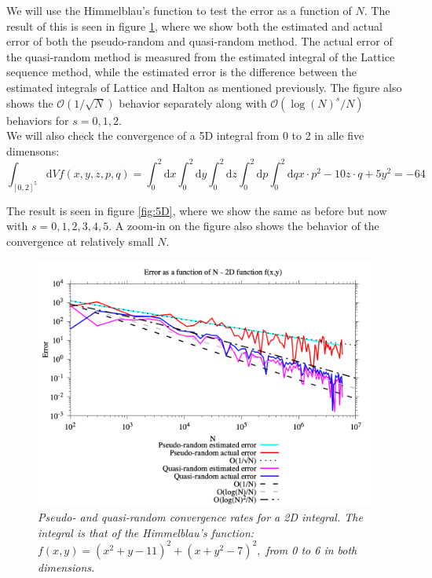 \documentclass{article}
\begin{document}
We will use the Himmelblau's function to test the error as a function of $N$.
The result of this is seen in figure \ref{fig:2D}, where we show both the estimated and
actual error of both the pseudo-random and quasi-random method. The actual error of the
quasi-random method is measured from the estimated integral of the Lattice sequence method,
while the estimated error is the difference between the estimated integrals of Lattice and
Halton as mentioned previously. The figure also shows the $\mathcal{O}(1/\sqrt{N})$ behavior
separately along with $\mathcal{O}(\log(N)^s/N)$ behaviors for $s=0,1,2$.
\\

We will also check the convergence of a 5D integral from 0 to 2 in alle five dimensons:
\begin{equation}
	\int_{[0,2]^5} \mathrm{d}V f(x,y,z,p,q) = \int_0^2 \mathrm{d}x \int_0^2 \mathrm{d}y \int_0^2 \mathrm{d}z
\int_0^2 \mathrm{d}p \int_0^2 \mathrm{d}q x\cdot p^2 -10 z\cdot q + 5y^2 = -64
\end{equation}

The result is seen in figure \ref{fig:5D}, where we show the same as before but now with $s=0,1,2,3,4,5$.
A zoom-in on the figure also shows the behavior of the convergence at relatively small $N$.
\\

\begin{figure}[t]
    \centering
    \includegraphics[width=\textwidth]{Convergence2D.png}
    \caption{\textsl{Pseudo- and quasi-random convergence rates for a 2D integral. The integral is that 
of the Himmelblau's function:} $f(x,y)=(x^2+y-11)^2+(x+y^2-7)^2,$ \textsl{from 0 to 6 in both dimensions.}}
    \label{fig:2D}
\end{figure}
\end{document}
